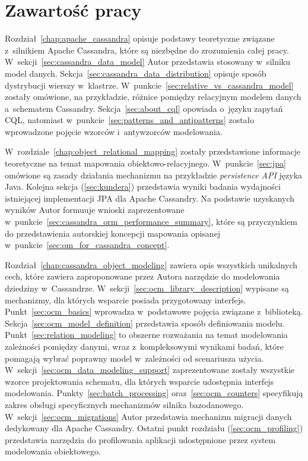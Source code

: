 \section{Zawartość pracy}

Rozdział~\ref{chap:apache_cassandra} opisuje podstawy teoretyczne związane z~silnikiem Apache Cassandra, które są niezbędne do zrozumienia całej pracy. W~sekcji~\ref{sec:cassandra_data_model} Autor przedstawia stosowany w~silniku model danych. Sekcja~\ref{sec:cassandra_data_distribution} opisuje sposób dystrybucji wierszy w~klastrze. W~punkcie~\ref{sec:relative_vs_cassandra_model} zostały omówione, na przykładzie, różnice pomiędzy relacyjnym modelem danych a~schematem Cassandry. Sekcja~\ref{sec:about_cql} opowiada o~języku zapytań CQL, natomiast w~punkcie~\ref{sec:patterns_and_antipatterns} zostało wprowadzone pojęcie wzorców i~antywzorców modelowania.

W~rozdziale~\ref{chap:object_relational_mapping} zostały przedstawione informacje teoretyczne na temat mapowania obiektowo-relacyjnego. W~punkcie~\ref{sec:jpa} omówione są zasady działania mechanizmu na przykładzie \emph{persistence API} języka Java. Kolejna sekcja (\ref{sec:kundera}) przedstawia wyniki badania wydajności istniejącej implementacji JPA dla Apache Cassandry. Na podstawie uzyskanych wyników Autor formuuje wnioski zaprezentowane w~punkcie~\ref{sec:cassandra_orm_performance_summary}, które są przyczynkiem do przedstawienia autorskiej koncepcji mapowania opisanej w~punkcie~\ref{sec:om_for_cassandra_concept}.

Rozdział~\ref{chap:cassandra_object_modeling} zawiera opis wszystkich unikalnych cech, które zawiera zaproponowane przez Autora narzędzie do modelowania dziedziny w~Cassandrze. W~sekcji~\ref{sec:ocm_library_description} wypisane są mechanizmy, dla których wsparcie posiada przygotowany interfejs. Punkt~\ref{sec:ocm_basics} wprowadza w~podstawowe pojęcia związane z~biblioteką. Sekcja~\ref{sec:ocm_model_definition} przedstawia sposób definiowania modelu. Punkt~\ref{sec:relation_modeling} to obszerne rozważania na temat modelowania zależności pomiędzy danymi, wraz z~kompleksowymi wynikami badań, które pomagają wybrać poprawny model w~zależności od scenariusza użycia. W~sekcji~\ref{sec:ocm_data_modeling_support} zaprezentowane zostały wszystkie wzorce projektowania schematu, dla których wsparcie udostępnia interfejs modelowania. Punkty~\ref{sec:batch_processing} oraz~\ref{sec:ocm_counters} specyfikują zakres obsługi specyficznych mechanizmów silnika bazodanowego. W~sekcji~\ref{sec:ocm_migrations} Autor przedstawia mechanizm migracji danych dedykowany dla Apache Cassandry. Ostatni punkt rozdziału (\ref{sec:ocm_profiling}) przedstawia narzędzia do profilowania aplikacji udostępnione przez system modelowania obiektowego.